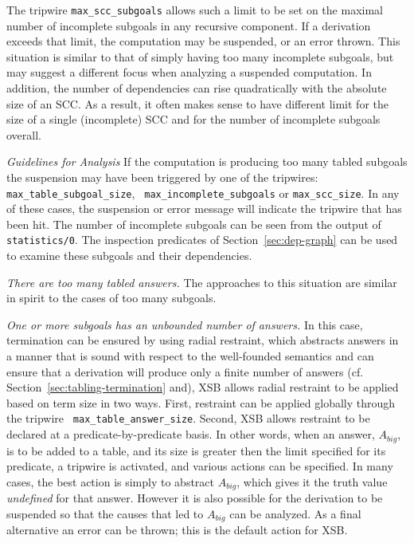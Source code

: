  The tripwire {\tt max\_scc\_subgoals} allows such a limit to be set
 on the maximal number of incomplete subgoals in any recursive
 component.  If a derivation exceeds that limit, the computation may
 be suspended, or an error thrown.  This situation is similar to that
 of simply having too many incomplete subgoals, but may suggest a
 different focus when analyzing a suspended computation.  In addition,
 the number of dependencies can rise quadratically with the absolute
 size of an SCC.  As a result, it often makes sense to have different
 limit for the size of a single (incomplete) SCC and for the number of
 incomplete subgoals overall.
%

{\em Guidelines for Analysis} If the computation is producing too many
 tabled subgoals the suspension may have been triggered by one of the
 tripwires: {\tt max\_table\_subgoal\_size}, {\tt
 max\_incomplete\_subgoals} or {\tt max\_scc\_size}.  In any of these
 cases, the suspension or error message will indicate the tripwire
 that has been hit.  The number of incomplete subgoals can be seen
 from the output of {\tt statistics/0}.  The inspection predicates of
 Section~\ref{sec:dep-graph} can be used to examine these subgoals and
 their dependencies.
%
\ei
\ei 

\bi

\item {\em There are too many tabled answers.} The approaches to this
  situation are similar in spirit to the cases of too many subgoals.
%
\bi
\item {\em One or more subgoals has an unbounded number of answers.}
  In this case, termination can be ensured by using radial restraint,
 which abstracts answers in a manner that is sound with respect to the
 well-founded semantics and can ensure that a derivation will produce
 only a finite number of answers
 (cf. Section~\ref{sec:tabling-termination} and\cite{GroS13}), XSB
 allows radial restraint to be applied based on term size in two ways.
  First, restraint can be applied globally through the tripwire {\tt
 max\_table\_answer\_size}.  Second, XSB allows restraint to be
 declared at a predicate-by-predicate basis.  In other words, when an
 answer, $A_{big}$, is to be added to a table, and its size is greater
 then the limit specified for its predicate, a tripwire is activated,
 and various actions can be specified.  In many cases, the best action
 is simply to abstract $A_{big}$, which gives it the truth value {\em
 undefined} for that answer. However it is also possible for the
 derivation to be suspended so that the causes that led to $A_{big}$
 can be analyzed.  As a final alternative an error can be thrown; this
 is the default action for XSB.

